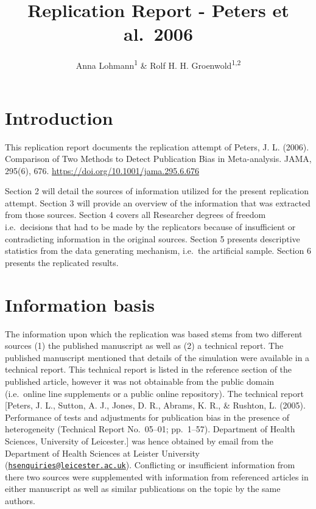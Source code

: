 \documentclass[english,doc,floatsintext]{apa6}
\title{Replication Report - Peters et al.~2006}
\author{Anna Lohmann\textsuperscript{1} \& Rolf H. H. Groenwold\textsuperscript{1,2}}
\date{}
\affiliation{\vspace{0.5cm}\textsuperscript{1} Department of Clinical Epidemiology, Leiden University Medical Center, Leiden, The Netherlands\\\textsuperscript{2} Rolf's second affiliation}
\begin{document}
\maketitle

\hypertarget{introduction}{%
\section{Introduction}\label{introduction}}

This replication report documents the replication attempt of Peters, J. L. (2006). Comparison of Two Methods to Detect Publication Bias in Meta-analysis. JAMA, 295(6), 676. \url{https://doi.org/10.1001/jama.295.6.676}

Section 2 will detail the sources of information utilized for the present replication attempt.
Section 3 will provide an overview of the information that was extracted from those sources.
Section 4 covers all Researcher degrees of freedom i.e.~decisions that had to be made by the replicators because of insufficient or contradicting information in the original sources.
Section 5 presents descriptive statistics from the data generating mechanism, i.e.~the artificial sample.
Section 6 presents the replicated results.

\hypertarget{information-basis}{%
\section{Information basis}\label{information-basis}}

The information upon which the replication was based stems from two different sources (1) the published manuscript as well as (2) a technical report.
The published manuscript mentioned that details of the simulation were available in a technical report.
This technical report is listed in the reference section of the published article, however it was not obtainable from the public domain (i.e.~online line supplements or a public online repository).
The technical report {[}Peters, J. L., Sutton, A. J., Jones, D. R., Abrams, K. R., \& Rushton, L. (2005). Performance of tests and adjustments for publication bias in the presence of heterogeneity (Technical Report No.~05--01; pp.~1--57). Department of Health Sciences, University of Leicester.{]} was hence obtained by email from the Department of Health Sciences at Leister University (\href{mailto:hsenquiries@leicester.ac.uk}{\nolinkurl{hsenquiries@leicester.ac.uk}}). Conflicting or insufficient information from there two sources were supplemented with information from referenced articles in either manuscript as well as similar publications on the topic by the same authors.
\end{document}

